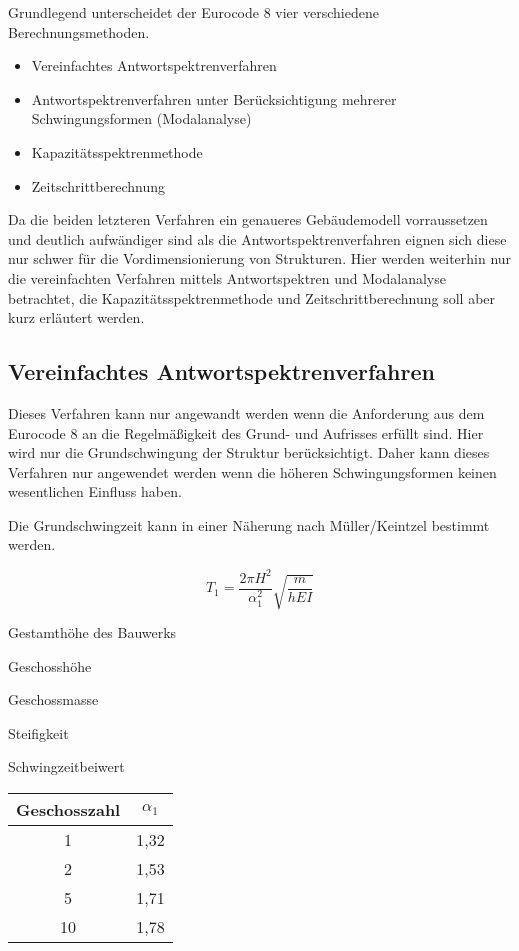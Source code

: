 Grundlegend unterscheidet der Eurocode 8 vier verschiedene Berechnungsmethoden.

\begin{itemize}
  \item Vereinfachtes Antwortspektrenverfahren
  \item Antwortspektrenverfahren unter Berücksichtigung mehrerer Schwingungsformen (Modalanalyse)
  \item Kapazitätsspektrenmethode
  \item Zeitschrittberechnung
\end{itemize}

Da die beiden letzteren Verfahren ein genaueres Gebäudemodell vorraussetzen und deutlich aufwändiger sind als die Antwortspektrenverfahren eignen sich diese nur schwer für die Vordimensionierung von Strukturen. 
Hier werden weiterhin nur die vereinfachten Verfahren mittels Antwortspektren und Modalanalyse betrachtet, die Kapazitätsspektrenmethode und Zeitschrittberechnung soll aber kurz erläutert werden.

\subsection{Vereinfachtes Antwortspektrenverfahren}
\label{sec:Antwortspektrenverfahren}

Dieses Verfahren kann nur angewandt werden wenn die Anforderung aus dem Eurocode 8 an die Regelmäßigkeit des Grund- und Aufrisses erfüllt sind.
Hier wird nur die Grundschwingung der Struktur berücksichtigt. Daher kann dieses Verfahren nur angewendet werden wenn die höheren Schwingungsformen keinen wesentlichen Einfluss haben.

Die Grundschwingzeit kann in einer Näherung nach Müller/Keintzel bestimmt werden.

\begin{equation*}
T_1 = \frac{2 \pi H^2}{\alpha_1^2}\sqrt{\frac{m}{hEI}}
\end{equation*}

\thinspace

\begin{multicols}{2}
 Gestamthöhe des Bauwerks \par
{} Geschosshöhe \par
{} Geschossmasse \par
{} Steifigkeit \par 
{} Schwingzeitbeiwert \par
\columnbreak
\begin{flushright}
\begin{tabular}{ |c|c| } 
 \hline
 Geschosszahl & $\alpha_1$ \\
 \hline\hline
 1 & 1,32 \\ 
 2 & 1,53 \\ 
 5 & 1,71 \\ 
 10 & 1,78 \\ 
 \hline
\end{tabular}
\end{flushright}
\end{multicols}

